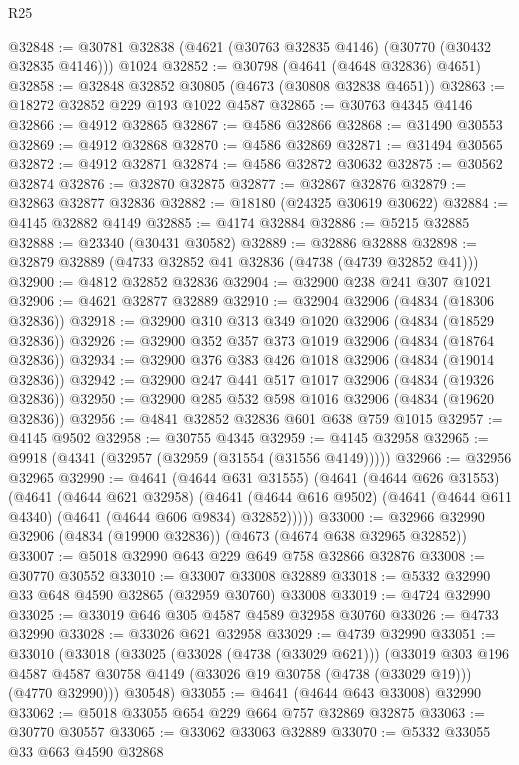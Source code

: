\begin{lexlean}{R25}
\begin{coremodule}
@32848 := @30781 @32838 (@4621 (@30763 @32835 @4146) (@30770 (@30432 @32835 @4146))) @1024
@32852 := @30798 (@4641 (@4648 @32836) @4651)
@32858 := @32848 @32852 @30805 (@4673 (@30808 @32838 @4651))
@32863 := @18272 @32852 @229 @193 @1022 @4587
@32865 := @30763 @4345 @4146
@32866 := @4912 @32865
@32867 := @4586 @32866
@32868 := @31490 @30553
@32869 := @4912 @32868
@32870 := @4586 @32869
@32871 := @31494 @30565
@32872 := @4912 @32871
@32874 := @4586 @32872 @30632
@32875 := @30562 @32874
@32876 := @32870 @32875
@32877 := @32867 @32876
@32879 := @32863 @32877 @32836
@32882 := @18180 (@24325 @30619 @30622)
@32884 := @4145 @32882 @4149
@32885 := @4174 @32884
@32886 := @5215 @32885
@32888 := @23340 (@30431 @30582)
@32889 := @32886 @32888
@32898 := @32879 @32889 (@4733 @32852 @41 @32836 (@4738 (@4739 @32852 @41)))
@32900 := @4812 @32852 @32836
@32904 := @32900 @238 @241 @307 @1021
@32906 := @4621 @32877 @32889
@32910 := @32904 @32906 (@4834 (@18306 @32836))
@32918 := @32900 @310 @313 @349 @1020 @32906 (@4834 (@18529 @32836))
@32926 := @32900 @352 @357 @373 @1019 @32906 (@4834 (@18764 @32836))
@32934 := @32900 @376 @383 @426 @1018 @32906 (@4834 (@19014 @32836))
@32942 := @32900 @247 @441 @517 @1017 @32906 (@4834 (@19326 @32836))
@32950 := @32900 @285 @532 @598 @1016 @32906 (@4834 (@19620 @32836))
@32956 := @4841 @32852 @32836 @601 @638 @759 @1015
@32957 := @4145 @9502
@32958 := @30755 @4345
@32959 := @4145 @32958
@32965 := @9918 (@4341 (@32957 (@32959 (@31554 (@31556 @4149)))))
@32966 := @32956 @32965
@32990 := @4641
    (@4644 @631 @31555)
    (@4641
      (@4644 @626 @31553)
      (@4641
        (@4644 @621 @32958)
        (@4641 (@4644 @616 @9502) (@4641 (@4644 @611 @4340) (@4641 (@4644 @606 @9834) @32852)))))
@33000 := @32966 @32990 @32906 (@4834 (@19900 @32836)) (@4673 (@4674 @638 @32965 @32852))
@33007 := @5018 @32990 @643 @229 @649 @758 @32866 @32876
@33008 := @30770 @30552
@33010 := @33007 @33008 @32889
@33018 := @5332 @32990 @33 @648 @4590 @32865 (@32959 @30760) @33008
@33019 := @4724 @32990
@33025 := @33019 @646 @305 @4587 @4589 @32958 @30760
@33026 := @4733 @32990
@33028 := @33026 @621 @32958
@33029 := @4739 @32990
@33051 := @33010
    (@33018
      (@33025
        (@33028 (@4738 (@33029 @621)))
        (@33019
          @303
          @196
          @4587
          @4587
          @30758
          @4149
          (@33026 @19 @30758 (@4738 (@33029 @19)))
          (@4770 @32990)))
      @30548)
@33055 := @4641 (@4644 @643 @33008) @32990
@33062 := @5018 @33055 @654 @229 @664 @757 @32869 @32875
@33063 := @30770 @30557
@33065 := @33062 @33063 @32889
@33070 := @5332 @33055 @33 @663 @4590 @32868

\end{coremodule}
\end{lexlean}
